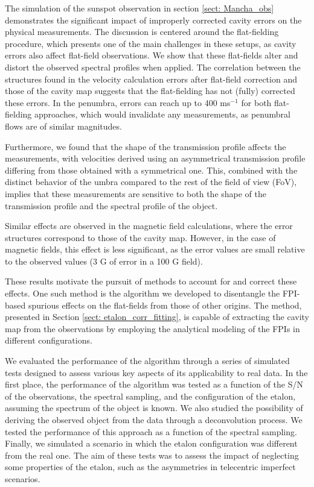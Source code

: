 The simulation of the sunspot observation in section \ref{sect: Mancha_obs} demonstrates the significant impact of improperly corrected cavity errors on the physical measurements. The discussion is centered around the flat-fielding procedure, which presents one of the main challenges in these setups, as cavity errors also affect flat-field observations. We show that these flat-fields alter and distort the observed spectral profiles when applied. The correlation between the structures found in the velocity calculation errors after flat-field correction and those of the cavity map suggests that the flat-fielding has not (fully) corrected these errors. In the penumbra, errors can reach up to 400 ms$^{-1}$ for both flat-fielding approaches, which would invalidate any measurements, as penumbral flows are of similar magnitudes.

Furthermore, we found that the shape of the transmission profile affects the measurements, with velocities derived using an asymmetrical transmission profile differing from those obtained with a symmetrical one. This, combined with the distinct behavior of the umbra compared to the rest of the field of view (FoV), implies that these measurements are sensitive to both the shape of the transmission profile and the spectral profile of the object.

Similar effects are observed in the magnetic field calculations, where the error structures correspond to those of the cavity map. However, in the case of magnetic fields, this effect is less significant, as the error values are small relative to the observed values (3 G of error in a 100 G field).

These results motivate the pursuit of methods to account for and correct these effects. One such method is the algorithm we developed to disentangle the FPI-based spurious effects on the flat-fields from those of other origins. The method, presented in Section \ref{sect: etalon_corr_fitting}, is capable of extracting the cavity map from the observations by employing the analytical modeling of the FPIs in different configurations.

We evaluated the performance of the algorithm through a series of simulated tests designed to assess various key aspects of its applicability to real data. In the first place, the performance of the algorithm was tested as a function of the S/N of the observations, the spectral sampling, and the configuration of the etalon, assuming the spectrum of the object is known. We also studied the possibility of deriving the observed object from the data through a deconvolution process. We tested the performance of this approach as a function of the spectral sampling. Finally, we simulated a scenario in which the etalon configuration was different from the real one. The aim of these tests was to assess the impact of neglecting some properties of the etalon, such as the asymmetries in telecentric imperfect scenarios.

